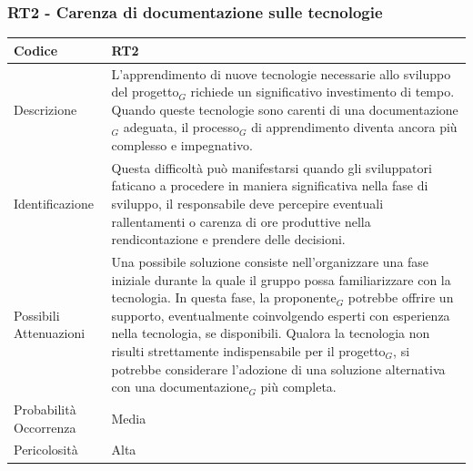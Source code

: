 \documentclass[10pt]{article}
\begin{document}
{    \subsubsection{RT2 - Carenza di documentazione sulle tecnologie}
    \label{RT2}
    \begin{tabularx}{\textwidth}{|l|X|}
    \hline
    \rowcolor{gray!25}
    Codice & RT2 \\
    \hline
    Descrizione & L'apprendimento di nuove tecnologie necessarie allo sviluppo del progetto$_G$ richiede un significativo investimento di tempo. Quando queste tecnologie sono carenti di una documentazione$_G$ adeguata, il processo$_G$ di apprendimento diventa ancora più complesso e impegnativo.\\
    \hline
    Identificazione & Questa difficoltà può manifestarsi quando gli sviluppatori faticano a procedere in maniera significativa nella fase di sviluppo, il responsabile deve percepire eventuali rallentamenti o carenza di ore produttive nella rendicontazione e prendere delle decisioni.  \\
    \hline
    Possibili Attenuazioni & Una possibile soluzione consiste nell'organizzare una fase iniziale durante la quale il gruppo possa familiarizzare con la tecnologia. In questa fase, la proponente$_G$ potrebbe offrire un supporto, eventualmente coinvolgendo esperti con esperienza nella tecnologia, se disponibili. Qualora la tecnologia non risulti strettamente indispensabile per il progetto$_G$, si potrebbe considerare l'adozione di una soluzione alternativa con una documentazione$_G$ più completa.\\
    \hline
    Probabilità Occorrenza & Media \\
    \hline
    Pericolosità & Alta \\ 
    \hline
    \end{tabularx}

}
\end{document}
